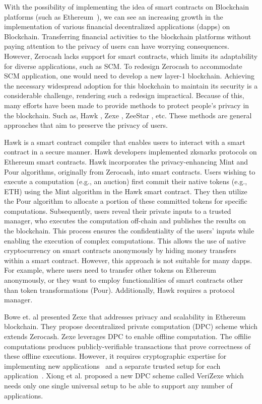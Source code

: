 With the possibility of implementing the idea of smart contracts on Blockchain platforms (such as Ethereum~\cite{ethereum}), we can see an increasing growth in the implementation of various financial decentralized applications (\glspl{dapp}) on Blockchain. Transferring financial activities to the blockchain platforms without paying attention to the privacy of users can have worrying consequences. However, Zerocash lacks support for smart contracts, which limits its adaptability for diverse applications, such as SCM. To redesign Zerocash to accommodate SCM application, one would need to develop a new layer-1 blockchain. Achieving the necessary widespread adoption for this blockchain to maintain its security is a considerable challenge, rendering such a redesign impractical.
Because of this, many efforts have been made to provide methods to protect people's privacy in the blockchain. Such as,  Hawk \cite{Hawk}, Zexe \cite{ZEXE}, ZeeStar \cite{ZeeStar}, etc. These methods are general approaches that aim to preserve the privacy of users.

Hawk \cite{Hawk} is a smart contract compiler that enables users to interact with a smart contract in a secure manner. Hawk developers implemented \glspl{zksnark} protocols on Ethereum smart contracts. Hawk incorporates the privacy-enhancing \textsf{Mint} and \textsf{Pour} algorithms, originally from Zerocash, into smart contracts. Users wishing to execute a computation (e.g., an auction) first commit their native tokens (e.g., ETH) using the \textsf{Mint} algorithm in the Hawk smart contract. They then utilize the \textsf{Pour} algorithm to allocate a portion of these committed tokens for specific computations. Subsequently, users reveal their private inputs to a trusted manager, who executes the computation off-chain and publishes the results on the blockchain. This process ensures the confidentiality of the users' inputs while enabling the  execution of complex computations. 
This allows the use of native cryptocurrency on smart contracts anonymously by hiding money transfers within a smart contract. However, this approach is not suitable for many \glspl{dapp}. For example, where users need to transfer other tokens on Ethereum anonymously, or they want to employ functionalities of smart contracts other than token transformations (\textsf{Pour}). Additionally, Hawk requires a protocol manager.

Bowe et. al presented Zexe \cite{ZEXE} that addresses privacy and scalability in Ethereum blockchain. They propose decentralized private computation (DPC) scheme which extends Zerocash. Zexe leverages DPC to enable offline computation. The offilie computations produces publicly-verifiable transactions that prove correctness of these offline executions. However, it requires cryptographic expertise for implementing new applications~\cite{ZeeStar} and a separate trusted setup for each application~\cite{VERI-ZEXE}. Xiong et al. \cite{VERI-ZEXE} proposed a new DPC scheme called VeriZexe which needs only one single universal setup to be able to support any number of applications.

